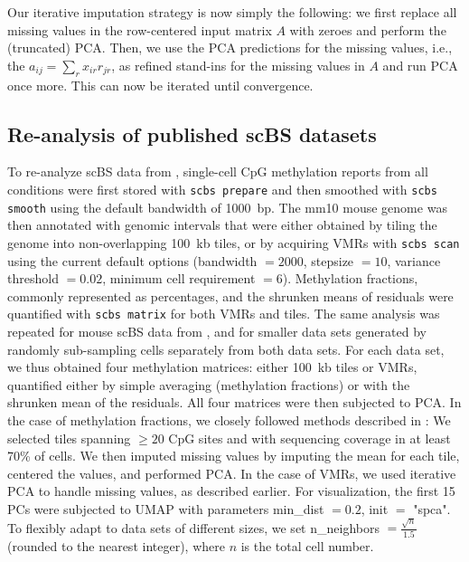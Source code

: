 \documentclass[twocolumn,10pt]{article}
\begin{document}
Our iterative imputation strategy is now simply the following: we first replace all missing values in the row-centered input matrix $A$ with zeroes and perform the (truncated) PCA.
Then, we use the PCA predictions for the missing values, i.e., the $a_{ij}=\sum_r x_{ir} r_{jr}$, as refined stand-ins for the missing values in $A$ and run PCA once more.
This can now be iterated until convergence.

\subsection{Re-analysis of published scBS datasets}
To re-analyze scBS data from \citet{kremer_scnmt}, single-cell CpG methylation reports from all conditions were first stored with \texttt{scbs prepare} and then smoothed with \texttt{scbs smooth} using the default bandwidth of 1000~bp.
The mm10 mouse genome was then annotated with genomic intervals that were either obtained by tiling the genome into non-overlapping 100~kb tiles, or by acquiring VMRs with \texttt{scbs scan} using the current default options (bandwidth $=2000$, stepsize $=10$, variance threshold $= 0.02$, minimum cell requirement $=6$).
Methylation fractions, commonly represented as percentages, and the shrunken means of residuals were quantified with \texttt{scbs matrix} for both VMRs and tiles.
The same analysis was repeated for mouse scBS data from \citet{luo2017single}, and for smaller data sets generated by randomly sub-sampling cells separately from both data sets.
For each data set, we thus obtained four methylation matrices:
either 100~kb tiles or VMRs, quantified either by simple averaging (methylation fractions) or with the shrunken mean of the residuals.
All four matrices were then subjected to PCA.
In the case of methylation fractions, we closely followed methods described in \citet{luo2017single}:
We selected tiles spanning $\ge20$ CpG sites and with sequencing coverage in at least 70\% of cells.
We then imputed missing values by imputing the mean for each tile, centered the values, and performed PCA.
In the case of VMRs, we used iterative PCA to handle missing values, as described earlier.
For visualization, the first 15 PCs were subjected to UMAP with parameters min\_dist $=0.2$, init $=$ "spca".
To flexibly adapt to data sets of different sizes, we set n\_neighbors  $=\frac{\sqrt{n}}{1.5}$ (rounded to the nearest integer), where $n$ is the total cell number.
\end{document}
